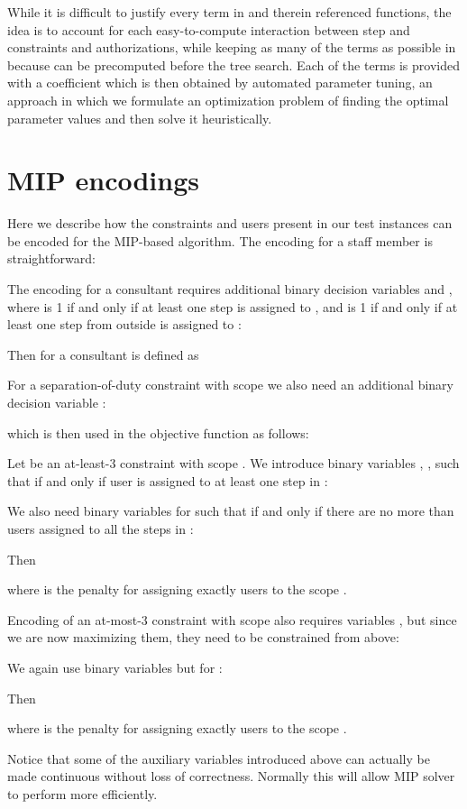 \documentclass[jcs,crcready]{iosart1c}
\begin{document}
 While it is difficult to justify every term in  and therein referenced functions, the idea is to account for each easy-to-compute interaction between step  and constraints and authorizations, while keeping as many of the terms as possible in  because  can be precomputed before the tree search.
 Each of the terms is provided with a coefficient which is then obtained by automated parameter tuning, an approach in which we formulate an optimization problem of finding the optimal parameter values and then solve it heuristically.
 
\section{MIP encodings}\label{sec:mip-encodings}

Here we describe how the constraints and users present in our test instances can be encoded for the MIP-based algorithm.
 The encoding for a staff member  is straightforward:
 
 The encoding for a consultant  requires additional binary decision
variables  and , where  is 1 if and only if at least one step
is assigned to , and  is 1 if and only if at least one step from
outside  is assigned to :

 Then  for a consultant is defined as



 For a separation-of-duty constraint  with scope  we also need an additional binary decision variable :
 
 which is then used in the objective function as follows:
 


 Let  be an at-least-3 constraint with scope .
 We introduce binary variables , , such that  if and only if user  is assigned to at least one step in :
 
 We also need binary variables  for  such that  if and only if there are no more than  users assigned to all the steps in :
 
 Then 
 
 where  is the penalty for assigning exactly  users to the scope .


 
 Encoding of an at-most-3 constraint  with scope  also requires variables , but since we are now maximizing them, they need to be constrained from above:
 
 We again use binary variables  but for :
 
 Then 
 
 where  is the penalty for assigning exactly  users to the scope .

Notice that some of the auxiliary variables introduced above can actually be made continuous without loss of correctness. Normally this will allow MIP solver to perform more efficiently.
\end{document}
